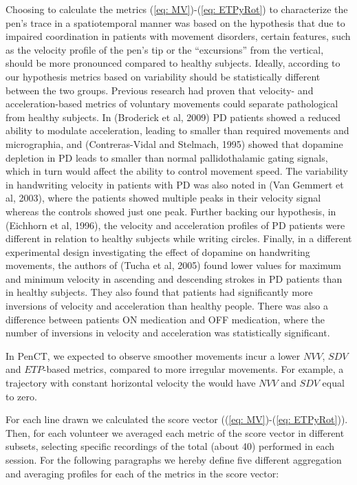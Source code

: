 Choosing to calculate the metrics (\ref{eq: MV})-(\ref{eq: ETPyRot}) to characterize the pen's trace in a spatiotemporal manner was based on the hypothesis that due to impaired coordination in patients with movement disorders, certain features, such as the velocity profile of the pen's tip or the ``excursions'' from the vertical, should be more pronounced compared to healthy subjects. Ideally, according to our hypothesis metrics based on variability should be statistically different between the two groups. Previous research had proven that velocity- and acceleration-based metrics of voluntary movements could separate pathological from healthy subjects. In (Broderick et al, 2009) \gls{PD} patients showed a reduced ability to modulate acceleration, leading to smaller than required movements and micrographia, and (Contreras-Vidal and Stelmach, 1995) showed  that dopamine depletion in \gls{PD} leads to smaller than normal pallidothalamic gating signals, which in turn would affect the ability to control movement speed. The variability in handwriting velocity in patients with \gls{PD} was also noted in (Van Gemmert et al, 2003), where the patients showed multiple peaks in their velocity signal whereas the controls showed just one peak. Further backing our hypothesis, in (Eichhorn et al, 1996), the velocity and acceleration profiles of \gls{PD} patients were different in relation to healthy subjects while writing circles. Finally, in a different experimental design investigating the effect of dopamine on handwriting movements, the authors of (Tucha et al, 2005) found lower values for maximum and minimum velocity in ascending and descending strokes in \gls{PD} patients than in healthy subjects. They also found that patients had significantly more inversions of velocity and acceleration than healthy people. There was also a difference between patients ON medication and OFF medication, where the number of inversions in velocity and acceleration was statistically significant. 

In \gls{PenCT}, we expected to observe smoother movements incur a lower $NVV$, $SDV$ and $ETP$-based metrics, compared to more irregular movements. For example, a trajectory with constant horizontal velocity the would have $NVV$ and $SDV$ equal to zero.

For each line drawn we calculated the score vector ((\ref{eq: MV})-(\ref{eq: ETPyRot})). Then, for each volunteer we averaged each metric of the score vector in different subsets, selecting specific recordings of the total (about 40) performed in each session. 
For the following paragraphs we hereby define five different aggregation and averaging profiles for each of the metrics in the score vector: 

